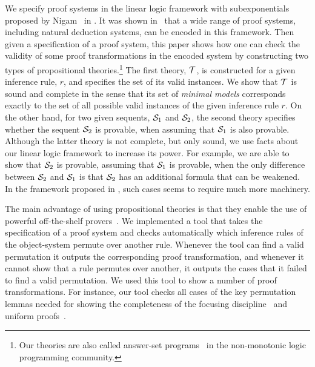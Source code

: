 
We specify proof systems in the linear logic framework with
subexponentials proposed by Nigam \etal\ in \cite{nigam11lsfa}. It was
shown in~\cite{nigam10jar,nigam11lsfa} that a wide range of proof systems,
including natural deduction systems, can be encoded in this
framework. 
Then given a specification of a proof system, this paper shows
how one can check the validity of some proof transformations in the encoded
system by constructing two types of propositional
theories.\footnote{Our theories are also
called answer-set programs~\cite{gelfond90iclp} in the non-monotonic logic
programming community.} The first
theory, ${\cal T}$, is constructed for a given inference rule,
$r$, and specifies the set of its valid instances. 
We show that ${\cal T}$ is sound and complete in the sense
that its set of \emph{minimal models} corresponds 
exactly to the set of all possible valid instances of the given inference
rule $r$. On the other hand, for two given sequents, ${\cal S}_1$ and
${\cal S}_2$, the second theory specifies whether
the sequent ${\cal S}_2$ is provable, when assuming that ${\cal S}_1$ is also
provable. Although the
latter theory is not complete, but only sound, we use facts about our 
linear logic framework to increase its power. For example,
we are able to show that ${\cal S}_2$ is provable,
assuming that ${\cal S}_1$ is provable, when the only difference between
${\cal S}_2$ and ${\cal S}_1$ is that ${\cal S}_2$ has an additional formula that
can be weakened. In the framework proposed in \cite{lutovac.unp}, such
cases seems to require much more machinery.

The main advantage of using propositional theories is that they enable the
use of powerful off-the-shelf
provers~\cite{niemela97lpmnr,leone06tcl}. We
implemented a tool that takes the specification of a proof system and
checks automatically which inference rules of the object-system permute
over another rule. Whenever the tool can find a valid permutation
it outputs the corresponding proof transformation,
and whenever it cannot
show that a rule permutes over another, it outputs the cases that it failed
to find a valid permutation. 
We used this tool to show a number of proof
transformations. For instance, our tool checks all cases of the key
permutation lemmas
needed for showing the completeness of the focusing
discipline~\cite{andreoli92jlc} and uniform proofs~\cite{miller91apal}.

